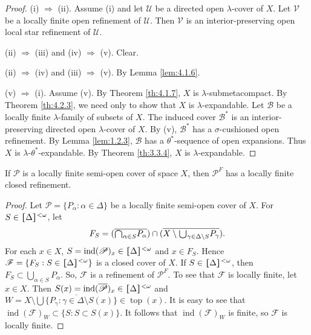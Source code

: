 \documentclass[ch4.tex]{subfiles}
\begin{document}
\begin{proof}
(i) $\Rightarrow$ (ii). Assume (i) and let $\mathscr{U}$ be a directed open
$\lambda$-cover of $X$. Let $\mathscr{V}$ be a locally finite open refinement of $\mathscr{U}$. Then
$\mathscr{V}$ is an interior-preserving open local star refinement of $\mathscr{U}$.

(ii) $\Rightarrow$ (iii) and (iv) $\Rightarrow$ (v). Clear.

(ii) $\Rightarrow$ (iv) and (iii) $\Rightarrow$ (v). By Lemma \ref{lem:4.1.6}.

(v) $\Rightarrow$ (i).
Assume (v). By Theorem \ref{th:4.1.7}, $X$ is $\lambda$-submetacompact. 
By Theorem \ref{th:4.2.3}, we need only to show that
$X$ is $\lambda$-expandable. Let $\mathscr{B}$ be a locally finite $\lambda$-family of subsets
of $X$. The induced cover
$\mathscr{B}^{*}$ is an interior-preserving directed open
$\lambda$-cover of $X$. By (v), $\mathscr{B}^*$ has a $\sigma$-cushioned open 
refinement. By Lemma \ref{lem:1.2.3}, $\mathscr{B}$ has a $\theta^*$-sequence 
of open expansions. Thus $X$ is $\lambda$-$\theta^*$-expandable. By 
Theorem \ref{th:3.3.4}, $X$ is $\lambda$-expandable.
\end{proof}

{\lemma{} \label{lem:4.2.5}
If $\mathscr{P}$ is a locally finite semi-open
cover of space $X$, then $\mathscr{P}^F$ has
a locally finite closed refinement.
}

\begin{proof}
Let $\mathscr{P} = \{P_\alpha: \alpha\in \Delta\}$ be a locally finite semi-open cover of $X$.
For $S \in \hstretch{1.8}{[}\Delta\hstretch{1.8}{]}^{<\omega}$, let
$$F_S = (\overline{\raisebox{-2pt}{\scalebox{1.5}{$\cap$}}_{\alpha \in S} P_\alpha}) \cap
 (\overline{X \setminus \raisebox{-2pt}{\scalebox{1.5}{$\cup$}}_{\gamma \in\Delta\setminus S} P_\gamma}).$$
\noindent For each $x \in X$,  $S = \operatorname{ind}(\mathscr{P})_x \in \hstretch{1.8}{[}\Delta\hstretch{1.8}{]}^{<\omega}$ 
and $x \in F_S$. Hence
$\mathscr{F} = \{F_S: S \in \hstretch{1.8}{[}\Delta\hstretch{1.8}{]}^{<\omega}\}$ is a closed
cover of $X$. If $S \in \hstretch{1.8}{[}\Delta\hstretch{1.8}{]}^{<\omega}$,
then $F_S \subset \bigcup_{\alpha \in S} P_\alpha$. 
So, $\mathscr{F}$ is a refinement of $\mathscr{P}^{F}$. To see that
$\mathscr{F}$ is locally finite, let $x \in X$. Then 
$S(x) = \operatorname{ind}(\overline{\mathscr{P}})_x \in \hstretch{1.8}{[}\Delta\hstretch{1.8}{]}^{<\omega}$ and
$W = X \setminus \overline{\bigcup \{P_\gamma: \gamma \in\Delta\setminus S(x)\}}
\in \operatorname{top}(x)$. It is easy to see that
$\operatorname{ind}(\mathscr{F})_W \subset \{S: S \subset S(x)\}$. 
It follows that $\operatorname{ind}(\mathscr{F})_W$ is finite,
so $\mathscr{F}$ is locally finite.
\end{proof}
\end{document}
